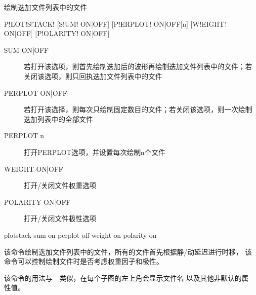 \label{sss:plotstack}

绘制迭加文件列表中的文件

\begin{SACSTX}
    P!LOT!S!TACK! [S!UM! ON|OFF] [P!ERPLOT! ON|OFF|n] [W!EIGHT! ON|OFF]
        [P!OLARITY! ON|OFF]
\end{SACSTX}

\begin{description}
\item [SUM ON|OFF] 若打开该选项，则首先绘制迭加后的波形再绘制迭加文件列表中的文件；若关闭该选项，则只回执迭加文件列表中的文件
\item [PERPLOT ON|OFF] 若打开该选择，则每次只绘制固定数目的文件；若关闭该选项，则一次绘制迭加列表中的全部文件
\item [PERPLOT n] 打开PERPLOT选项，并设置每次绘制n个文件
\item [WEIGHT ON|OFF] 打开/关闭文件权重选项
\item [POLARITY ON|OFF] 打开/关闭文件极性选项
\end{description}

\begin{SACDFT}
plotstack sum on perplot off weight on polarity on
\end{SACDFT}

该命令绘制迭加文件列表中的文件，所有的文件首先根据静/动延迟进行时移，
该命令可以控制绘制文件时是否考虑权重因子和极性。

该命令的用法与~~类似，在每个子图的左上角会显示文件名
以及其他非默认的属性值。

